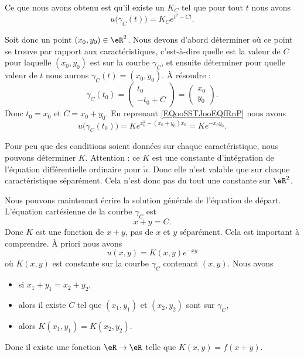 Ce que nous avons obtenu est qu'il existe un \( K_C\) tel que pour tout \( t\) nous avons
\begin{equation}
	u\big( \gamma_C(t) \big)=K_C e^{t^2-Ct}.
\end{equation}

Soit donc un point \( (x_0,y_0)\in \eR^2\). Nous devons d'abord déterminer où ce point se trouve par rapport aux caractéristiques, c'est-à-dire quelle est la valeur de \( C\) pour laquelle \( (x_0,y_0)\) est sur la courbe \( \gamma_C\), et ensuite déterminer pour quelle valeur de \( t\) nous aurons \( \gamma_C(t)=(x_0,y_0)\). À résoudre :
\begin{equation}
	\gamma_C(t_0)=\begin{pmatrix}
		t_0 \\
		-t_0+C
	\end{pmatrix}=\begin{pmatrix}
		x_0 \\
		y_0
	\end{pmatrix}.
\end{equation}
Donc \( t_0=x_0\) et \( C=x_0+y_0\). En reprenant \eqref{EQooSSTJooEQfRnP} nous avons
\begin{equation}
	u\big( \gamma_C(t_0) \big)=K e^{x_0^2-(x_0+y_0)x_0}=K e^{-x_0y_0}.
\end{equation}

Pour peu que des conditions soient données sur chaque caractéristique, nous pouvons déterminer \( K\). Attention : ce \( K\) est une constante d'intégration de l'équation différentielle ordinaire pour \( \tilde u\). Donc elle n'est valable que sur chaque caractéristique séparément. Cela n'est donc pas du tout une constante sur \( \eR^2\).

Nous pouvons maintenant écrire la solution générale de l'équation de départ. L'équation cartésienne de la courbe \( \gamma_C\) est
\begin{equation}
	x+y=C.
\end{equation}
Donc \( K\) est une fonction de \( x+y\), pas de \( x\) et \( y\) séparément. Cela est important à comprendre. À priori nous avons
\begin{equation}
	u(x,y)=K(x,y) e^{-xy}
\end{equation}
où \( K(x,y)\) est constante sur la courbe \( \gamma_C\) contenant \( (x,y)\). Nous avons
\begin{itemize}
	\item si \( x_1+y_1=x_2+y_2\),
	\item alors il existe \( C\) tel que \( (x_1,y_1)\) et \( (x_2,y_2)\) sont sur \( \gamma_C\),
	\item alors \( K(x_1,y_1)=K(x_2,y_2)\).
\end{itemize}
Donc il existe une fonction \( \eR\to \eR\) telle que \( K(x,y)=f(x+y)\).

